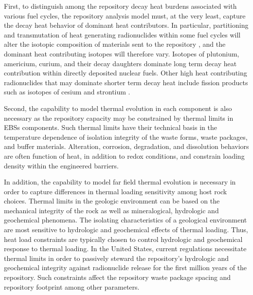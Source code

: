 First, to distinguish among the repository decay heat burdens associated with 
various fuel cycles, the repository analysis model must, at the very least, 
capture the decay heat behavior of dominant heat contributors. In particular, 
partitioning and transmutation of heat generating radionuclides within  some 
fuel cycles will alter the isotopic composition of materials sent to the 
repository \cite{swift_applying_2010}, and the dominant heat contributing 
isotopes will therefore vary.  Isotopes of plutonium, americium, curium, and their 
decay daughters dominate long term decay heat contribution within directly 
deposited nuclear fuels.  Other high heat contributing radionuclides that may 
dominate shorter term decay heat include fission products such as isotopes of 
cesium and strontium \cite{piet_which_2007}. 

Second, the capability to model thermal evolution in each component is also 
necessary as the repository capacity may be constrained by thermal limits in 
\glspl{EBS} components. Such thermal limits have their technical basis in the 
temperature dependence of isolation integrity of the waste forms, waste 
packages, and buffer materials. Alteration, corrosion, degradation, and 
dissolution behaviors are often function of heat, in addition to redox 
conditions, and constrain loading density within the engineered barriers. 

In addition, the capability to model far field thermal evolution is necessary 
in order to capture differences in thermal loading sensitivity among host rock 
choices. Thermal limits in the geologic environment can be based on the 
mechanical integrity of the rock as well as mineralogical, hydrologic and 
geochemical phenomena. The isolating characteristics of a geological 
environment are most sensitive to hydrologic and geochemical effects of thermal 
loading. Thus, heat load constraints are typically chosen to control hydrologic 
and geochemical response to thermal loading. In the United States, current 
regulations necessitate thermal limits in order to passively steward the 
repository's hydrologic and geochemical integrity against radionuclide  release 
for the first million years of the repository.  Such constraints affect the 
repository waste package spacing and repository footprint among other 
parameters. 

